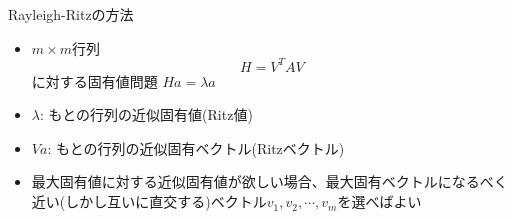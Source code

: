 \begin{frame}[t,fragile]{Rayleigh-Ritzの方法}
  \begin{itemize}
  \item $m \times m$行列
    \[
    H = V^T A V
    \]
    に対する固有値問題 $H a = \lambda a$
  \item $\lambda$: もとの行列の近似固有値(Ritz値)
  \item $Va$: もとの行列の近似固有ベクトル(Ritzベクトル)
  \item 最大固有値に対する近似固有値が欲しい場合、最大固有ベクトルになるべく近い(しかし互いに直交する)ベクトル$v_1,v_2,\cdots,v_m$を選べばよい
  \end{itemize}
\end{frame}
